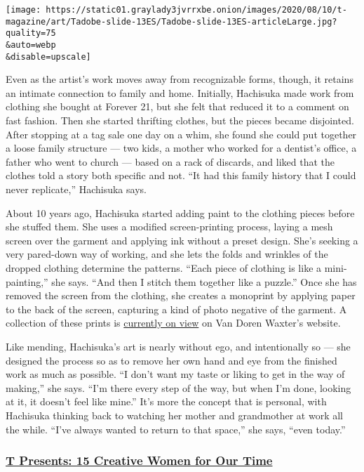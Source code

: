\texttt{[image: https://static01.graylady3jvrrxbe.onion/images/2020/08/10/t-magazine/art/Tadobe-slide-13ES/Tadobe-slide-13ES-articleLarge.jpg?quality=75\\\&auto=webp\\\&disable=upscale]}

Even as the artist's work moves away from recognizable forms, though, it
retains an intimate connection to family and home. Initially, Hachisuka
made work from clothing she bought at Forever 21, but she felt that
reduced it to a comment on fast fashion. Then she started thrifting
clothes, but the pieces became disjointed. After stopping at a tag sale
one day on a whim, she found she could put together a loose family
structure --- two kids, a mother who worked for a dentist's office, a
father who went to church --- based on a rack of discards, and liked
that the clothes told a story both specific and not. ``It had this
family history that I could never replicate,'' Hachisuka says.

About 10 years ago, Hachisuka started adding paint to the clothing
pieces before she stuffed them. She uses a modified screen-printing
process, laying a mesh screen over the garment and applying ink without
a preset design. She's seeking a very pared-down way of working, and she
lets the folds and wrinkles of the dropped clothing determine the
patterns. ``Each piece of clothing is like a mini-painting,'' she says.
``And then I stitch them together like a puzzle.'' Once she has removed
the screen from the clothing, she creates a monoprint by applying paper
to the back of the screen, capturing a kind of photo negative of the
garment. A collection of these prints is
\href{https://www.vandorenwaxter.com/exhibitions/aiko-hachisuka3}{currently
on view} on Van Doren Waxter's website.

Like mending, Hachisuka's art is nearly without ego, and intentionally
so --- she designed the process so as to remove her own hand and eye
from the finished work as much as possible. ``I don't want my taste or
liking to get in the way of making,'' she says. ``I'm there every step
of the way, but when I'm done, looking at it, it doesn't feel like
mine.'' It's more the concept that is personal, with Hachisuka thinking
back to watching her mother and grandmother at work all the while.
``I've always wanted to return to that space,'' she says, ``even
today.''

\hypertarget{t-presents-15-creative-women-for-our-time}{%
\subsubsection{\texorpdfstring{\href{https://www.nytimes3xbfgragh.onion/interactive/2020/08/10/t-magazine/creative-women-designers-artists-chefs.html}{T
Presents: 15 Creative Women for Our
Time}}{T Presents: 15 Creative Women for Our Time}}\label{t-presents-15-creative-women-for-our-time}}

